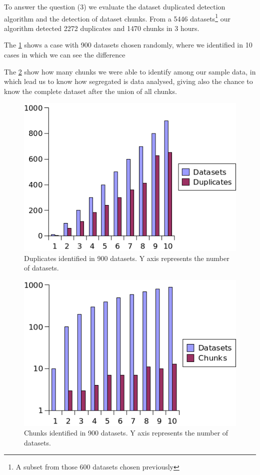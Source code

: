 \documentclass[sw]{iosart2x}
\begin{document}
To answer the question (3) we evaluate the dataset duplicated detection algorithm and the detection of dataset chunks.
From a \num{5446} datasets\footnote{A subset from those 600 datasets chosen previously} our algorithm detected \num{2272} duplicates and \num{1470} chunks in 3 hours.

The \cref{fig:identDuplicates} shows a case with 900 datasets chosen randomly, where we identified in 10 cases in which we can see the difference 

The \cref{fig:identChunks} show how many chunks we were able to identify among our sample data, in which lead us to know how segregated is data analysed, giving also the chance to know the complete dataset after the union of all chunks.

\begin{figure}[htb] 
	\centering
	\includegraphics[width=\linewidth]{img/DsDuplicate.png}
	\caption{Duplicates identified in 900 datasets. Y axis represents the number of datasets.}
	\label{fig:identDuplicates}
\end{figure}

\begin{figure}[htb] 
	\centering
	\includegraphics[width=\linewidth]{img/DsChunks.png}
	\caption{Chunks identified in 900 datasets. Y axis represents the number of datasets.}
	\label{fig:identChunks}
\end{figure}
\end{document}
